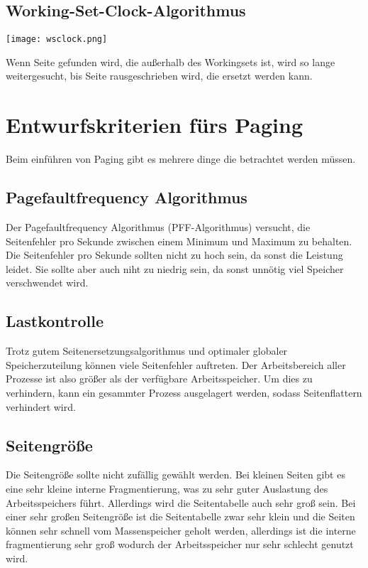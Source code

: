 \subsection{Working-Set-Clock-Algorithmus}

\texttt{[image: wsclock.png]}

Wenn Seite gefunden wird, die außerhalb des Workingsets ist, wird so lange weitergesucht, bis Seite rausgeschrieben wird, die ersetzt werden kann.

\section{Entwurfskriterien fürs Paging}

Beim einführen von Paging gibt es mehrere dinge die betrachtet werden müssen.

\subsection{Pagefaultfrequency Algorithmus}

Der Pagefaultfrequency Algorithmus (PFF-Algorithmus) versucht, die Seitenfehler pro Sekunde zwischen einem Minimum und Maximum zu behalten.  Die Seitenfehler pro Sekunde sollten nicht zu hoch sein, da sonst die Leistung leidet. Sie sollte aber auch niht zu niedrig sein, da sonst unnötig viel Speicher verschwendet wird.

\subsection{Lastkontrolle}

Trotz gutem Seitenersetzungsalgorithmus und optimaler globaler Speicherzuteilung können viele Seitenfehler auftreten. Der Arbeitsbereich aller Prozesse ist also größer als der verfügbare Arbeitsspeicher. Um dies zu verhindern, kann ein gesammter Prozess ausgelagert werden, sodass Seitenflattern verhindert wird.

\subsection{Seitengröße}

Die Seitengröße sollte nicht zufällig gewählt werden. Bei kleinen Seiten gibt es eine sehr kleine interne Fragmentierung, was zu sehr guter Auslastung des Arbeitsspeichers führt. Allerdings wird die Seitentabelle auch sehr groß sein. Bei einer sehr großen Seitengröße ist die Seitentabelle zwar sehr klein und die Seiten können sehr schnell vom Massenspeicher geholt werden, allerdings ist die interne fragmentierung sehr groß wodurch der Arbeitsspeicher nur sehr schlecht genutzt wird.

